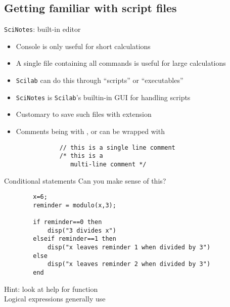 \documentclass[%
    10pt,
    xcolor={dvipsnames},
    compress, %
]{beamer}
\newcommand{\hint}[1]{{\small\alert{Hint: #1}}}
\newcommand{\scilab}{\texttt{Scilab}}
\newcommand{\scinotes}{\texttt{SciNotes}}
\newcommand{\setitemsep}[1]{\setlength\itemsep{#1}}
\begin{document}
\subsection{Getting familiar with script files}
\begin{frame}[fragile]{\scinotes: built-in editor}
    \begin{itemize}
        \setitemsep{1em}
        \item Console is only useful for short calculations
        \item A single file containing all commands is useful for large calculations
        \item<2-> \scilab{} can do this through ``scripts'' or ``executables''
        \item<3-> \scinotes{} is \scilab's builtin-in GUI for handling scripts
        \item<4-> Customary to save such files with  extension
        \item<5-> Comments being with \inlinecode{//}, or can be wrapped with \inlinecode{/* */}
        \begin{lstlisting}
            // this is a single line comment
            /* this is a
               multi-line comment */
        \end{lstlisting}
    \end{itemize}
\end{frame}

\begin{frame}[fragile]{Conditional statements}
    Can you make sense of this?
    \begin{lstlisting}
        x=6;
        reminder = modulo(x,3);
        
        if reminder==0 then
            disp("3 divides x")
        elseif reminder==1 then
            disp("x leaves reminder 1 when divided by 3")
        else
            disp("x leaves reminder 2 when divided by 3")
        end
    \end{lstlisting}
    \hint{look at help for function }\\[1em]
    Logical expressions generally use 
\end{frame}
\end{document}
